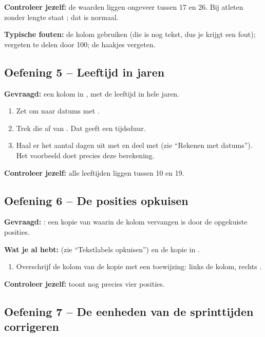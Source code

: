 \documentclass[11pt,a4paper]{article}
\begin{document}
\textbf{Controleer jezelf:} de waarden liggen ongeveer tussen 17 en 26.
Bij atleten zonder lengte staat ; dat is normaal.

\textbf{Typische fouten:} de kolom  gebruiken (die is
nog tekst, dus je krijgt een fout); vergeten te delen door 100; de haakjes
vergeten.

\subsection*{Oefening 5 -- Leeftijd in jaren}

\textbf{Gevraagd:} een kolom  in , met
de leeftijd in hele jaren.

\begin{enumerate}
  \item Zet  om naar datums met .
  \item Trek die af van . Dat geeft een tijdsduur.
  \item Haal er het aantal dagen uit met  en deel met
         (zie ``Rekenen met datums''). Het voorbeeld
         doet precies deze berekening.
\end{enumerate}

\textbf{Controleer jezelf:} alle leeftijden liggen tussen 10 en 19.

\subsection*{Oefening 6 -- De posities opkuisen}

\textbf{Gevraagd:} : een kopie van
 waarin de kolom  vervangen is door de
opgekuiste posities.

\textbf{Wat je al hebt:}  (zie ``Tekstlabels
opkuisen'') en de kopie in .

\begin{enumerate}
  \item Overschrijf de kolom  van de kopie met een
        toewijzing: links de kolom, rechts .
\end{enumerate}

\textbf{Controleer jezelf:} 
toont nog precies vier posities.

\subsection*{Oefening 7 -- De eenheden van de sprinttijden corrigeren}
\end{document}
